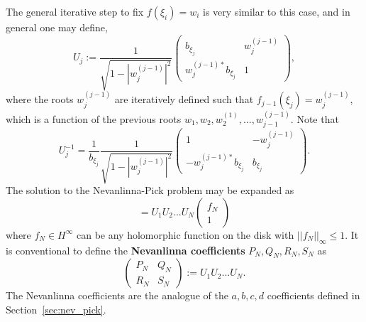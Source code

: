 The general iterative step to fix $f(\xi_i) = w_i$ is very similar to this case, and in general one may define,
\begin{equation}
    U_j := \frac{1}{\sqrt{1 - |w_j^{(j-1)}|^2}} \begin{pmatrix}
        b_{\xi_j} & w_j^{(j-1)} \\ 
        w_j^{(j-1)*} b_{\xi_j} & 1
    \end{pmatrix},
\end{equation}
where the roots $w_j^{(j - 1)}$ are iteratively defined such that $f_{j-1}(\xi_j) = w_j^{(j-1)}$, which is a function of the previous roots $w_1, w_2, w_2^{(1)}, ..., w_{j - 1}^{(j-1)}$. Note that
\begin{equation}
    U_j^{-1} = \frac{1}{b_{\xi_j}} \frac{1}{\sqrt{1 - |w_j^{(j-1)}|^2}} \begin{pmatrix}
        1 & -w_j^{(j-1)} \\ -w_j^{(j-1) *} b_{\xi_j} & b_{\xi_j}
    \end{pmatrix}.
\end{equation}
The solution to the Nevanlinna-Pick problem may be expanded as
\begin{equation}
    [f] = U_1 U_2 ... U_N \begin{pmatrix}
        f_N \\ 1
    \end{pmatrix}
\end{equation}
where $f_N\in H^\infty$ can be any holomorphic function on the disk with $||f_N||_\infty\leq 1$. It is conventional to define the \textbf{Nevanlinna coefficients} $P_N, Q_N, R_N, S_N$ as
\begin{equation}
    \begin{pmatrix}
        P_N & Q_N \\ R_N & S_N
    \end{pmatrix} := U_1 U_2 ... U_N.
    \label{eq:nev_coeffs}
\end{equation}
The Nevanlinna coefficients are the analogue of the $a, b, c, d$ coefficients defined in Section~\ref{sec:nev_pick}. 

